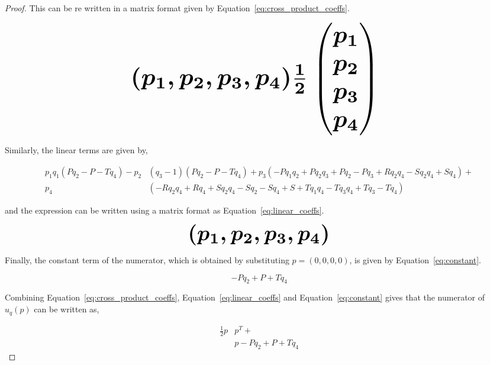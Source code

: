 \begin{proof}
This can be re written in a matrix format given by
Equation~\ref{eq:cross_product_coeffs}.

\begin{equation}\label{eq:cross_product_coeffs}
    \resizebox{0.9\linewidth}{!}{\arraycolsep=2.5pt%
    \boldmath\(
    (p_1, p_2, p_3, p_4) \frac{1}{2}  \begin{pmatrix}
    p_1 \\
    p_2 \\
    p_3 \\
    p_4 \end{pmatrix}
    \) }
\end{equation}

Similarly, the linear terms are given by,

\begingroup
\footnotesize
\begin{align*}
p_{1} q_{1} (P q_{2} - P - T q_{4}) - p_{2} & (q_{3} - 1) (P q_{2} - P - T q_{4}) + p_{3} (- P q_{1} q_{2} + P q_{2} q_{3} + P q_{2} - P q_{3} + R q_{2} q_{4} - S q_{2} q_{4} + S q_{4}) + \\
p_{4} & (- R q_{2} q_{4} + R q_{4} + S q_{2} q_{4} - S q_{2} - S q_{4} + S + T q_{1} q_{4} - T q_{3} q_{4} + T q_{3} - T q_{4})
\end{align*}
\endgroup

and the expression can be written using a matrix format as
Equation~\ref{eq:linear_coeffs}.

\begin{equation}\label{eq:linear_coeffs}
    \resizebox{0.50\linewidth}{!}{\arraycolsep=2.5pt%
    \boldmath\(
    (p_1, p_2, p_3, p_4) \)}
\end{equation}

Finally, the constant term of the numerator, which is obtained by
substituting $p=(0, 0, 0, 0)$, is given by Equation~\ref{eq:constant}.

\begin{equation}\label{eq:constant}
- P q_{2} + P + T q_{4}
\end{equation}

Combining Equation~\ref{eq:cross_product_coeffs}, Equation~\ref{eq:linear_coeffs} and
Equation~\ref{eq:constant} gives that the numerator of \(u_q(p)\) can be written
as,

\begingroup
\tiny\boldmath
\begin{align*}
    \frac{1}{2}p &  p^T +  \\
    &  p - P q_{2} + P + T q_{4}
\end{align*}
\endgroup


\end{proof}
